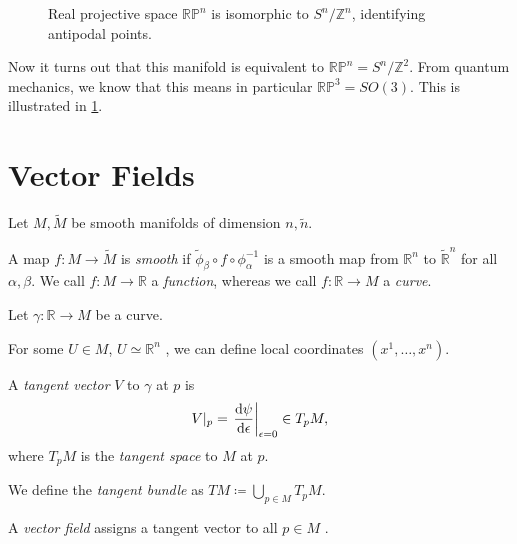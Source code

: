 \begin{figure}[tbhp]
  \centering
  \def\svgwidth{0.4\columnwidth}
  
  \caption{Real projective space $\mathbb{RP}^n$ is isomorphic to $S^n / \mathbb{Z}^n$, identifying antipodal points.}
  \label{fig:l2f1}
\end{figure}

Now it turns out that this manifold is equivalent to $\mathbb{RP}^n = S^n / \mathbb{Z}^2$. From quantum mechanics, we know that this means in particular $\mathbb{RP}^3 = SO(3)$.
This is illustrated in \ref{fig:l2f1}.

\section{Vector Fields}%
\label{sec:vector_fields}

Let $M, \widetilde{M}$ be smooth manifolds of dimension $n, \tilde{n}$.
\begin{definition}
  A map $f\colon M \to \widetilde{M}$ is \emph{smooth} if $\widetilde{\phi}_{\beta} \circ f \circ \phi_{\alpha}^{-1}$ is a smooth map from $\mathbb{R}^n$ to $\widetilde{\mathbb{R}}^n$ for all $\alpha, \beta$.
  We call $f \colon M \to \mathbb{R}$ a \emph{function}, whereas we call $f\colon \mathbb{R} \to M$ a \emph{curve}.
\end{definition} 

Let $\gamma\colon \mathbb{R} \to M$ be a curve.
\begin{figure}[tbph]
  \centering
  \def\svgwidth{0.4\columnwidth}
  
  \caption{}
  \label{fig:l2f2}
\end{figure}
For some $U \in M$,  $U \simeq \mathbb{R}^n$ , we can define local coordinates $(x^1, \dots, x^n)$.

\begin{definition}
  A \emph{tangent vector} $V$  to $\gamma$ at  $p$ is 
   \begin{equation}
     \label{eq:tv}
     V\rvert_p = \left. \dv{\psi}{\epsilon}\right\rvert_{\epsilon = 0} \in T_p M,
  \end{equation}
  where $T_p M$ is the \emph{tangent space} to $M$ at $p$.
\end{definition}
\begin{definition}
  We define the \emph{tangent bundle} as $T M \coloneqq \bigcup_{p \in M} T_p M$.
\end{definition}
\begin{definition}
  A \emph{vector field} assigns a tangent vector to all $p \in M$ .
\end{definition}

